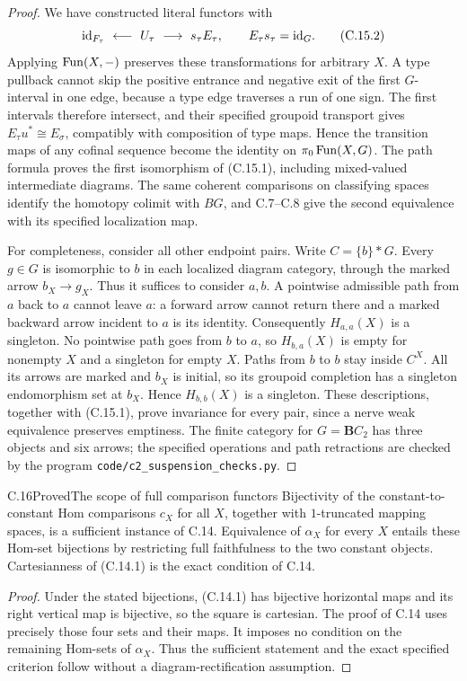 \begin{proof}
We have constructed literal functors with
\[
 \mathrm{id}_{F_\tau}\ \longleftarrow\ U_\tau\
     \longrightarrow\ s_\tau E_\tau,
 \qquad E_\tau s_\tau=\mathrm{id}_G. \tag{C.15.2}
\]
Applying $\operatorname{Fun}(X,-)$ preserves these transformations for arbitrary $X$. A type pullback cannot skip the positive entrance and negative exit of the first $G$-interval in one edge, because a type edge traverses a run of one sign. The first intervals therefore intersect, and their specified groupoid transport gives $E_\tau u^*\cong E_\sigma$, compatibly with composition of type maps. Hence the transition maps of any cofinal sequence become the identity on $\pi_0\operatorname{Fun}(X,G)$. The path formula proves the first isomorphism of (C.15.1), including mixed-valued intermediate diagrams. The same coherent comparisons on classifying spaces identify the homotopy colimit with $BG$, and C.7--C.8 give the second equivalence with its specified localization map.

For completeness, consider all other endpoint pairs. Write $C=\{b\}*G$. Every $g\in G$ is isomorphic to $b$ in each localized diagram category, through the marked arrow $b_X\to g_X$. Thus it suffices to consider $a,b$. A pointwise admissible path from $a$ back to $a$ cannot leave $a$: a forward arrow cannot return there and a marked backward arrow incident to $a$ is its identity. Consequently $H_{a,a}(X)$ is a singleton. No pointwise path goes from $b$ to $a$, so $H_{b,a}(X)$ is empty for nonempty $X$ and a singleton for empty $X$. Paths from $b$ to $b$ stay inside $C^X$. All its arrows are marked and $b_X$ is initial, so its groupoid completion has a singleton endomorphism set at $b_X$. Hence $H_{b,b}(X)$ is a singleton. These descriptions, together with (C.15.1), prove invariance for every pair, since a nerve weak equivalence preserves emptiness. The finite category for $G=\mathbf BC_2$ has three objects and six arrows; the specified operations and path retractions are checked by the program \texttt{code/c2\_suspension\_checks.py}.

\end{proof}

\begin{claim}{C.16}{Proved}{The scope of full comparison functors}
Bijectivity of the constant-to-constant Hom comparisons $c_X$ for all $X$, together with $1$-truncated mapping spaces, is a sufficient instance of C.14. Equivalence of $\alpha_X$ for every $X$ entails these Hom-set bijections by restricting full faithfulness to the two constant objects. Cartesianness of (C.14.1) is the exact condition of C.14.
\end{claim}
\begin{proof}
Under the stated bijections, (C.14.1) has bijective horizontal maps and its right vertical map is bijective, so the square is cartesian. The proof of C.14 uses precisely those four sets and their maps. It imposes no condition on the remaining Hom-sets of $\alpha_X$. Thus the sufficient statement and the exact specified criterion follow without a diagram-rectification assumption.
\end{proof}
